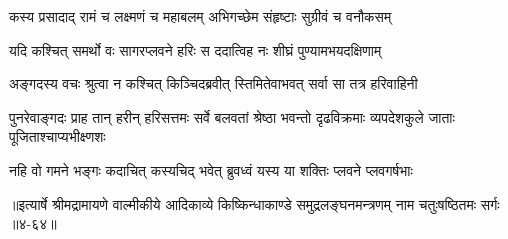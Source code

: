 \twolineshloka
{कस्य प्रसादाद् रामं च लक्ष्मणं च महाबलम्}
{अभिगच्छेम संहृष्टाः सुग्रीवं च वनौकसम्} %

\twolineshloka
{यदि कश्चित् समर्थो वः सागरप्लवने हरिः}
{स ददात्विह नः शीघ्रं पुण्यामभयदक्षिणाम्} %

\twolineshloka
{अङ्गदस्य वचः श्रुत्वा न कश्चित् किञ्चिदब्रवीत्}
{स्तिमितेवाभवत् सर्वा सा तत्र हरिवाहिनी} %

\threelineshloka
{पुनरेवाङ्गदः प्राह तान् हरीन् हरिसत्तमः}
{सर्वे बलवतां श्रेष्ठा भवन्तो दृढविक्रमाः}
{व्यपदेशकुले जाताः पूजिताश्चाप्यभीक्ष्णशः} %

\twolineshloka
{नहि वो गमने भङ्गः कदाचित् कस्यचिद् भवेत्}
{ब्रुवध्वं यस्य या शक्तिः प्लवने प्लवगर्षभाः} %


॥इत्यार्षे श्रीमद्रामायणे वाल्मीकीये आदिकाव्ये किष्किन्धाकाण्डे समुद्रलङ्घनमन्त्रणम् नाम चतुःषष्ठितमः सर्गः ॥४-६४॥
